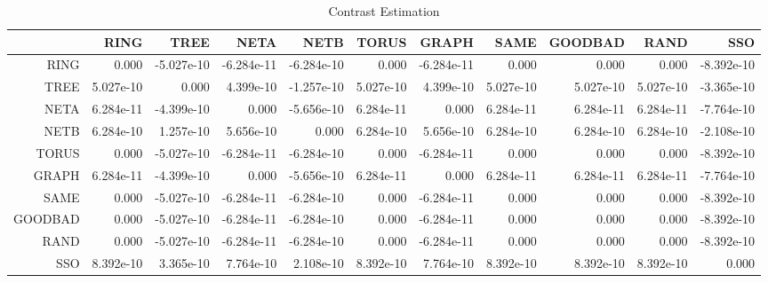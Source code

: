\documentclass[a4paper,10pt]{article}
\begin{document}
\begin{landscape}
\begin{table}[!htp]
\centering\tiny
\caption{Contrast Estimation}
\begin{tabular}{
|r|r|r|r|r|r|r|r|r|r|r|}
\hline
 & RING& TREE& NETA& NETB& TORUS& GRAPH& SAME& GOODBAD& RAND& SSO\\
\hline
 RING&0.000&-5.027e-10&-6.284e-11&-6.284e-10&0.000&-6.284e-11&0.000&0.000&0.000&-8.392e-10\\
\hline
 TREE&5.027e-10&0.000&4.399e-10&-1.257e-10&5.027e-10&4.399e-10&5.027e-10&5.027e-10&5.027e-10&-3.365e-10\\
\hline
 NETA&6.284e-11&-4.399e-10&0.000&-5.656e-10&6.284e-11&0.000&6.284e-11&6.284e-11&6.284e-11&-7.764e-10\\
\hline
 NETB&6.284e-10&1.257e-10&5.656e-10&0.000&6.284e-10&5.656e-10&6.284e-10&6.284e-10&6.284e-10&-2.108e-10\\
\hline
 TORUS&0.000&-5.027e-10&-6.284e-11&-6.284e-10&0.000&-6.284e-11&0.000&0.000&0.000&-8.392e-10\\
\hline
 GRAPH&6.284e-11&-4.399e-10&0.000&-5.656e-10&6.284e-11&0.000&6.284e-11&6.284e-11&6.284e-11&-7.764e-10\\
\hline
 SAME&0.000&-5.027e-10&-6.284e-11&-6.284e-10&0.000&-6.284e-11&0.000&0.000&0.000&-8.392e-10\\
\hline
 GOODBAD&0.000&-5.027e-10&-6.284e-11&-6.284e-10&0.000&-6.284e-11&0.000&0.000&0.000&-8.392e-10\\
\hline
 RAND&0.000&-5.027e-10&-6.284e-11&-6.284e-10&0.000&-6.284e-11&0.000&0.000&0.000&-8.392e-10\\
\hline
 SSO&8.392e-10&3.365e-10&7.764e-10&2.108e-10&8.392e-10&7.764e-10&8.392e-10&8.392e-10&8.392e-10&0.000\\
\hline

\end{tabular}
\end{table}

\newpage


\end{landscape}
\end{document}
